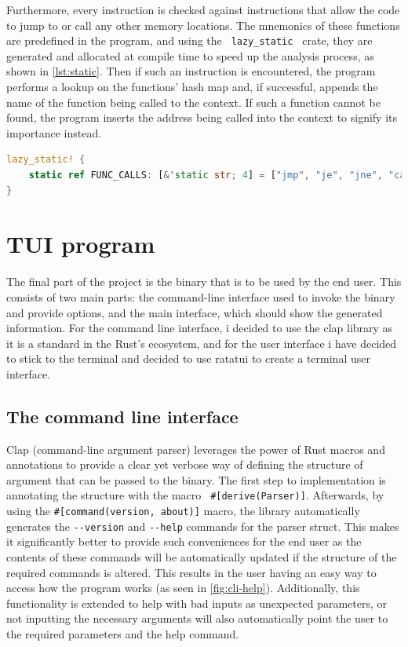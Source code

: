 Furthermore, every instruction is checked against instructions that allow the code to jump to or call any other memory locations.
The mnemonics of these functions are predefined in the program, and using the \verb| lazy_static | \cite{lobel_rust-lang-nurserylazy-static_2020} crate, they are generated and allocated at compile time to speed up the analysis process, as shown in \autoref{lst:static}.
Then if such an instruction is encountered, the program performs a lookup on the functions' hash map and, if successful, appends the name of the function being called to the context.
If such a function cannot be found, the program inserts the address being called into the context to signify its importance instead.

\begin{lstlisting}[caption=\label{lst:static}{The statically initialized assembly function array}, language=Rust]
lazy_static! {
    static ref FUNC_CALLS: [&'static str; 4] = ["jmp", "je", "jne", "call"];
}
\end{lstlisting}

\section{TUI program}

The final part of the project is the binary that is to be used by the end user.
This consists of two main parts: the command-line interface used to invoke the binary and provide options, and the main interface, which should show the generated information.
For the command line interface, i decided to use the clap \cite{clap-rs_team_clap-rsclap_2024} library as it is a standard in the Rust's ecosystem, and for the user interface i have decided to stick to the terminal and decided to use ratatui \cite{ratatui_team_ratatuiratatui_2024} to create a terminal user interface.

\subsection{The command line interface}

Clap (command-line argument parser) leverages the power of Rust macros and annotations to provide a clear yet verbose way of defining the structure of argument that can be passed to the binary.
The first step to implementation is annotating the structure with the macro \verb| #[derive(Parser)]|.
Afterwards, by using the \verb|#[command(version, about)]| macro, the library automatically generates the \verb|--version| and \verb|--help| commands for the parser struct.
This makes it significantly better to provide such conveniences for the end user as the contents of these commands will be automatically updated if the structure of the required commands is altered.
This results in the user having an easy way to access how the program works (as seen in \autoref{fig:cli-help}).
Additionally, this functionality is extended to help with bad inputs as unexpected parameters, or not inputting the necessary arguments will also automatically point the user to the required parameters and the help command.

